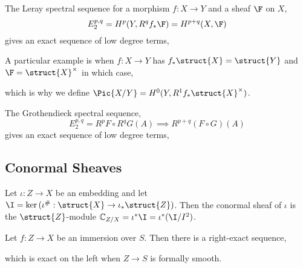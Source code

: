 \documentclass[12pt]{article}
\begin{document}
\begin{example}
The Leray spectral sequence for a morphism $f : X \to Y$ and a sheaf $\F$ on $X$,
\[ E^{p,q}_2 = H^p(Y, R^q f_* \F) = H^{p+q}(X, \F) \]
gives an exact sequence of low degree terms,
\begin{center}
\end{center}
A particular example is when $f : X \to Y$ has $f_* \struct{X} = \struct{Y}$ and $\F = \struct{X}^\times$ in which case,
\begin{center}
\end{center}
which is why we define $\Pic{X/Y} = H^0(Y, R^1 f_* \struct{X}^\times)$.
\end{example}

\begin{example}
The Grothendieck spectral sequence,
\[ E^{p,q}_2 = R^p F \circ R^q G(A) \implies R^{p+q}(F \circ G)(A) \]
gives an exact sequence of low degree terms,
\begin{center}
\end{center}
\end{example}

\subsection{Conormal Sheaves}

\begin{defn}
Let $\iota : Z \to X$ be an embedding and let $\I = \ker{(\iota^\# : \struct{X} \to \iota_* \struct{Z})}$. Then the conormal sheaf of $\iota$ is the $\struct{Z}$-module $\C_{Z/X} = \iota^* \I = \iota^* (\I/I^2)$.
\end{defn}

\begin{prop}
Let $f : Z \to X$ be an immersion over $S$. Then there is a right-exact sequence,
\begin{center}
\end{center}
which is exact on the left when $Z \to S$ is formally smooth.
\end{prop}
\end{document}
